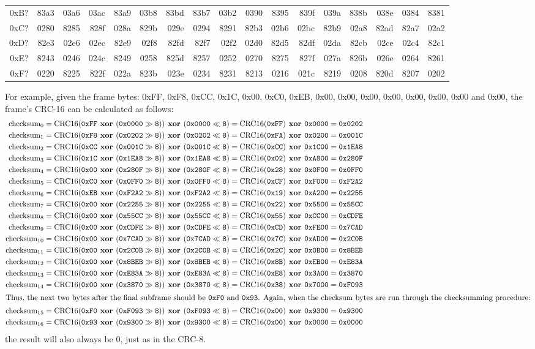 \begin{table}[h]
{\begin{tabular}{|r||r|r|r|r|r|r|r|r|r|r|r|r|r|r|r|r|}
0xB? & 83a3 & 03a6 & 03ac & 83a9 & 03b8 & 83bd & 83b7 & 03b2 & 0390 & 8395 & 839f & 039a & 838b & 038e & 0384 & 8381 \\
0xC? & 0280 & 8285 & 828f & 028a & 829b & 029e & 0294 & 8291 & 82b3 & 02b6 & 02bc & 82b9 & 02a8 & 82ad & 82a7 & 02a2 \\
0xD? & 82e3 & 02e6 & 02ec & 82e9 & 02f8 & 82fd & 82f7 & 02f2 & 02d0 & 82d5 & 82df & 02da & 82cb & 02ce & 02c4 & 82c1 \\
0xE? & 8243 & 0246 & 024c & 8249 & 0258 & 825d & 8257 & 0252 & 0270 & 8275 & 827f & 027a & 826b & 026e & 0264 & 8261 \\
0xF? & 0220 & 8225 & 822f & 022a & 823b & 023e & 0234 & 8231 & 8213 & 0216 & 021c & 8219 & 0208 & 820d & 8207 & 0202 \\
\hline
\end{tabular}
}
\end{table}
\par
\noindent
For example, given the frame bytes:
0xFF, 0xF8, 0xCC, 0x1C, 0x00, 0xC0, 0xEB, 0x00, 0x00, 0x00, 0x00,
0x00, 0x00, 0x00 and 0x00, the frame's CRC-16 can be calculated as
follows:
{
\begin{align}
\CRCSIXTEEN{0}{0xFF}{0x0000}{0xFF}{0x0000}{0x0202} \\
\CRCSIXTEEN{1}{0xF8}{0x0202}{0xFA}{0x0200}{0x001C} \\
\CRCSIXTEEN{2}{0xCC}{0x001C}{0xCC}{0x1C00}{0x1EA8} \\
\CRCSIXTEEN{3}{0x1C}{0x1EA8}{0x02}{0xA800}{0x280F} \\
\CRCSIXTEEN{4}{0x00}{0x280F}{0x28}{0x0F00}{0x0FF0} \\
\CRCSIXTEEN{5}{0xC0}{0x0FF0}{0xCF}{0xF000}{0xF2A2} \\
\CRCSIXTEEN{6}{0xEB}{0xF2A2}{0x19}{0xA200}{0x2255} \\
\CRCSIXTEEN{7}{0x00}{0x2255}{0x22}{0x5500}{0x55CC} \\
\CRCSIXTEEN{8}{0x00}{0x55CC}{0x55}{0xCC00}{0xCDFE} \\
\CRCSIXTEEN{9}{0x00}{0xCDFE}{0xCD}{0xFE00}{0x7CAD} \\
\CRCSIXTEEN{10}{0x00}{0x7CAD}{0x7C}{0xAD00}{0x2C0B} \\
\CRCSIXTEEN{11}{0x00}{0x2C0B}{0x2C}{0x0B00}{0x8BEB} \\
\CRCSIXTEEN{12}{0x00}{0x8BEB}{0x8B}{0xEB00}{0xE83A} \\
\CRCSIXTEEN{13}{0x00}{0xE83A}{0xE8}{0x3A00}{0x3870} \\
\CRCSIXTEEN{14}{0x00}{0x3870}{0x38}{0x7000}{0xF093} \\
\intertext{Thus, the next two bytes after the final subframe should be
\texttt{0xF0} and \texttt{0x93}.
Again, when the checksum bytes are run through the checksumming procedure:}
\CRCSIXTEEN{15}{0xF0}{0xF093}{0x00}{0x9300}{0x9300} \\
\CRCSIXTEEN{16}{0x93}{0x9300}{0x00}{0x0000}{0x0000}
\end{align}
the result will also always be 0, just as in the CRC-8.
}
